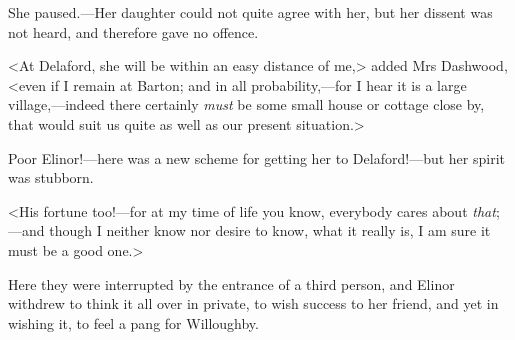 She paused.—Her daughter could not quite agree with her, but her dissent was not heard, and therefore gave no offence.

<At Delaford, she will be within an easy distance of me,> added Mrs Dashwood, <even if I remain at Barton; and in all probability,—for I hear it is a large village,—indeed there certainly \textit{must} be some small house or cottage close by, that would suit us quite as well as our present situation.>

Poor Elinor!—here was a new scheme for getting her to Delaford!—but her spirit was stubborn.

<His fortune too!—for at my time of life you know, everybody cares about \textit{that};—and though I neither know nor desire to know, what it really is, I am sure it must be a good one.>

Here they were interrupted by the entrance of a third person, and Elinor withdrew to think it all over in private, to wish success to her friend, and yet in wishing it, to feel a pang for Willoughby.